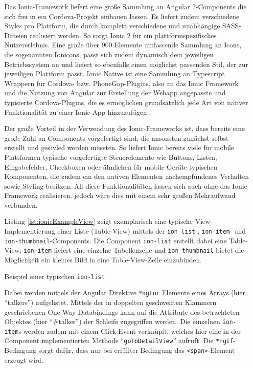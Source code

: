 Das Ionic-Framework liefert eine große Sammlung an Angular 2-Components die sich frei in ein Cordova-Projekt einbauen lassen. Es liefert zudem verschiedene Styles pro Plattform, die durch komplett verschiedene und unabhängige SASS-Dateien realisiert werden. So sorgt Ionic 2 für ein plattformspezifisches Nutzererlebnis. Eine große über 900 Elemente umfassende Sammlung an Icons, die sogenannten Ionicons, passt sich zudem dynamisch dem jeweiligen Betriebssystem an und liefert so ebenfalls einen möglichst passenden Stil, der zur jeweiligen Plattform passt. Ionic Native ist eine Sammlung an Typescript Wrappern für Cordova- bzw. PhoneGap-Plugins, also an das Ionic Framework und die Nutzung von Angular zur Erstellung der Webapp angepasste und typisierte Cordova-Plugins, die es ermöglichen grundsätzlich jede Art von nativer Funktionalität zu einer Ionic-App hinzuzufügen \cite{ionic2Docu}.

Der große Vorteil in der Verwendung des Ionic-Frameworks ist, dass bereits eine große Zahl an Components vorgefertigt sind, die ansonsten zunächst selbst erstellt und gestyled werden müssten. So liefert Ionic bereits viele für mobile Plattformen typische vorgefertigte Steuerelemente wie Buttons, Listen, Eingabefelder, Checkboxen oder ähnlichen für mobile Geräte typischen Komponenten, die zudem ein den nativen Elementen nachempfundenes Verhalten sowie Styling besitzen. All diese Funktionalitäten lassen sich auch ohne das Ionic Framework realisieren, jedoch wäre dies mit einem sehr großen Mehraufwand verbunden. 

Listing \ref{lst:ionicExampleView} zeigt exemplarisch eine typische View-Implementierung einer Liste (Table-View) mittels der \texttt{ion-list}-, \texttt{ion-item}- und \texttt{ion-thumbnail}-Components. Die Component \texttt{ion-list} erstellt dabei eine Table-View, \texttt{ion-item} liefert eine einzelne Tabellenzeile und \texttt{ion-thumbnail} bietet die Möglichkeit ein kleines Bild in eine Table-View-Zeile einzubinden.

\begin{listing}[htb]
    
    \caption{Beispiel einer typischen \texttt{ion-list}}
    \label{lst:ionicExampleView}
\end{listing}

Dabei werden mittels der Angular Direktive \texttt{*ngFor} Elemente eines Arrays (hier \enquote{talkers}) aufgelistet. Mittels der in doppelten geschweiften Klammern geschriebenen One-Way-Databindings kann auf die Attribute des betrachteten Objektes (hier \enquote{\#talker}) der Schleife zugegriffen werden. Die einzelnen \texttt{ion-item}s werden zudem mit einem Click-Event verknüpft, welches hier eine in der Component implementierten Methode \enquote{\texttt{goToDetailView}} aufruft. Die \texttt{*ngIf}-Bedingung sorgt dafür, dass nur bei erfüllter Bedingung das \texttt{<span>}-Element erzeugt wird.

